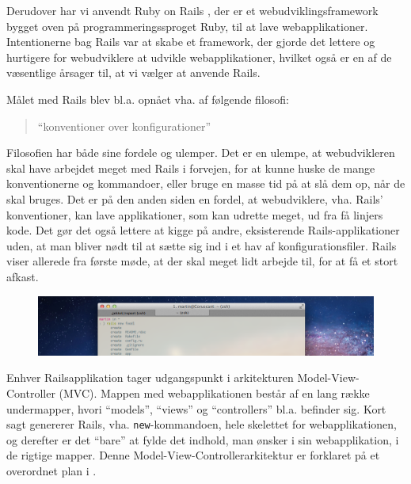 Derudover har vi anvendt Ruby on Rails \cite{rubyonrailswiki}, der er et webudviklingsframework bygget oven på programmeringssproget Ruby, til at lave webapplikationer. Intentionerne bag Rails var at skabe et framework, der gjorde det lettere og hurtigere for webudviklere at udvikle webapplikationer, hvilket også er en af de væsentlige årsager til, at vi vælger at anvende Rails. 

Målet med Rails blev bl.a. opnået vha. af følgende filosofi:
\begin{quote}
``konventioner over konfigurationer''
\end{quote} 

Filosofien har både sine fordele og ulemper. Det er en ulempe, at webudvikleren skal have arbejdet meget med Rails i forvejen, for at kunne huske de mange konventionerne og kommandoer, eller bruge en masse tid på at slå dem op, når de skal bruges. Det er på den anden siden en fordel, at webudviklere, vha. Rails' konventioner, kan lave applikationer, som kan udrette meget, ud fra få linjers kode. Det gør det også lettere at kigge på andre, eksisterende Rails-applikationer uden, at man bliver nødt til at sætte sig ind i et hav af konfigurationsfiler. Rails viser allerede fra første møde, at der skal meget lidt arbejde til, for at få et stort afkast. 

\begin{figure}
	\centering
	\includegraphics[scale=0.4]{billeder/Rails-new-foodl-martin.png}
	\label{fig:Rails-new-foodl}
\end{figure}

Enhver Railsapplikation tager udgangspunkt i arkitekturen Model-View-Controller (MVC). Mappen med webapplikationen består af en lang række undermapper, hvori ``models'', ``views'' og ``controllers'' bl.a. befinder sig. Kort sagt genererer Rails, vha. \texttt{new}-kommandoen, hele skelettet for webapplikationen, og derefter er det ``bare'' at fylde det indhold, man ønsker i sin webapplikation, i de rigtige mapper. Denne Model-View-Controllerarkitektur er forklaret på et overordnet plan i .

